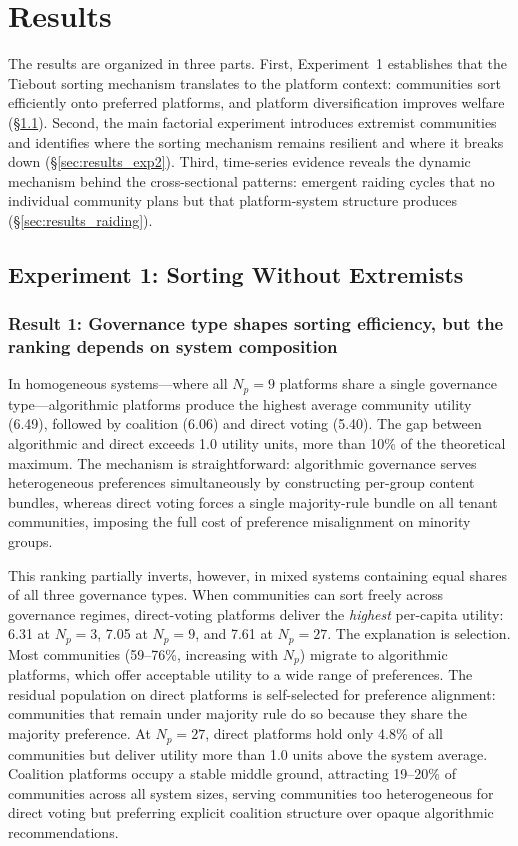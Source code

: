 \section{Results}
\label{sec:results}

The results are organized in three parts. First, Experiment~1 establishes that the Tiebout sorting mechanism translates to the platform context: communities sort efficiently onto preferred platforms, and platform diversification improves welfare (\S\ref{sec:results_exp1}). Second, the main factorial experiment introduces extremist communities and identifies where the sorting mechanism remains resilient and where it breaks down (\S\ref{sec:results_exp2}). Third, time-series evidence reveals the dynamic mechanism behind the cross-sectional patterns: emergent raiding cycles that no individual community plans but that platform-system structure produces (\S\ref{sec:results_raiding}).

\subsection{Experiment 1: Sorting Without Extremists}
\label{sec:results_exp1}

\subsubsection{Result 1: Governance type shapes sorting efficiency, but the ranking depends on system composition}

In homogeneous systems---where all $N_p = 9$ platforms share a single governance type---algorithmic platforms produce the highest average community utility (6.49), followed by coalition (6.06) and direct voting (5.40). The gap between algorithmic and direct exceeds 1.0 utility units, more than 10\% of the theoretical maximum. The mechanism is straightforward: algorithmic governance serves heterogeneous preferences simultaneously by constructing per-group content bundles, whereas direct voting forces a single majority-rule bundle on all tenant communities, imposing the full cost of preference misalignment on minority groups.

This ranking partially inverts, however, in mixed systems containing equal shares of all three governance types. When communities can sort freely across governance regimes, direct-voting platforms deliver the \textit{highest} per-capita utility: 6.31 at $N_p = 3$, 7.05 at $N_p = 9$, and 7.61 at $N_p = 27$. The explanation is selection. Most communities (59--76\%, increasing with $N_p$) migrate to algorithmic platforms, which offer acceptable utility to a wide range of preferences. The residual population on direct platforms is self-selected for preference alignment: communities that remain under majority rule do so because they share the majority preference. At $N_p = 27$, direct platforms hold only 4.8\% of all communities but deliver utility more than 1.0 units above the system average. Coalition platforms occupy a stable middle ground, attracting 19--20\% of communities across all system sizes, serving communities too heterogeneous for direct voting but preferring explicit coalition structure over opaque algorithmic recommendations.

